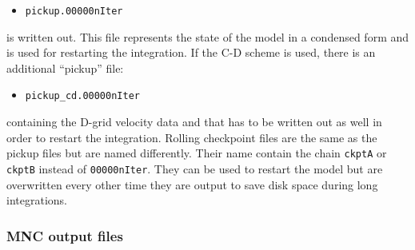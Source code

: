 \begin{itemize}
\item \texttt{pickup.00000nIter}
\end{itemize}

is written out. This file represents the state of the model in a condensed
form and is used for restarting the integration. If the C-D scheme is used,
there is an additional ``pickup'' file:

\begin{itemize}
\item \texttt{pickup\_cd.00000nIter}
\end{itemize}

containing the D-grid velocity data and that has to be written out as well
in order to restart the integration. Rolling checkpoint files are the same
as the pickup files but are named differently. Their name contain the chain 
\texttt{ckptA} or \texttt{ckptB} instead of \texttt{00000nIter}. They can be
used to restart the model but are overwritten every other time they are
output to save disk space during long integrations.



\subsubsection{MNC output files}

